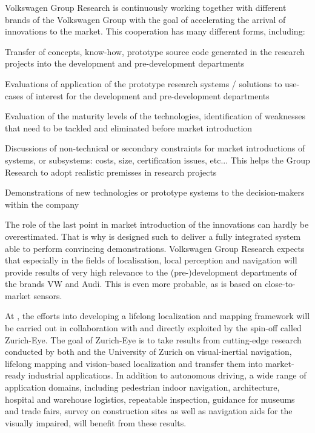 Volkswagen Group Research is continuously working together with different brands of the Volkswagen Group with the goal of accelerating the arrival of innovations to the market. This cooperation has many different forms, including:
\begin{denseItemize}
  \item Transfer of concepts, know-how, prototype source code generated in the research projects into the development and pre-development departments
	\item Evaluations of application of the prototype research systems / solutions to use-cases of interest for the development and pre-development departments
	\item Evaluation of the maturity levels of the technologies, identification of weaknesses that need to be tackled and eliminated before market introduction
	\item Discussions of non-technical or secondary constraints for market introductions of systems, or subsystems: costs, size, certification issues, etc... This helps the Group Research to adopt realistic premisses in research projects
	\item Demonstrations of new technologies or prototype systems to the decision-makers within the company
\end{denseItemize}
The role of the last point in market introduction of the innovations can hardly be overestimated. That is why \Project is designed such to deliver a fully integrated system able to perform convincing demonstrations.
Volkswagen Group Research expects that especially in the fields of localisation, local perception and navigation \Project will provide results of very high relevance to the (pre-)development departments of the brands VW and Audi. This is even more probable, as \Project is based on close-to-market sensors.

At \ETHZ, the efforts into developing a lifelong localization and mapping framework will be carried out in collaboration with and directly exploited by the spin-off called Zurich-Eye. The goal of Zurich-Eye is to take results from cutting-edge research conducted by both \ETHZ and the University of Zurich on visual-inertial navigation, lifelong mapping and vision-based localization and transfer them into market-ready industrial applications. In addition to autonomous driving, a wide range of application domains, including pedestrian indoor navigation, architecture, hospital and warehouse logistics, repeatable inspection, guidance for museums and trade fairs, survey on construction sites as well as navigation aids for the visually impaired, will benefit from these results. 

